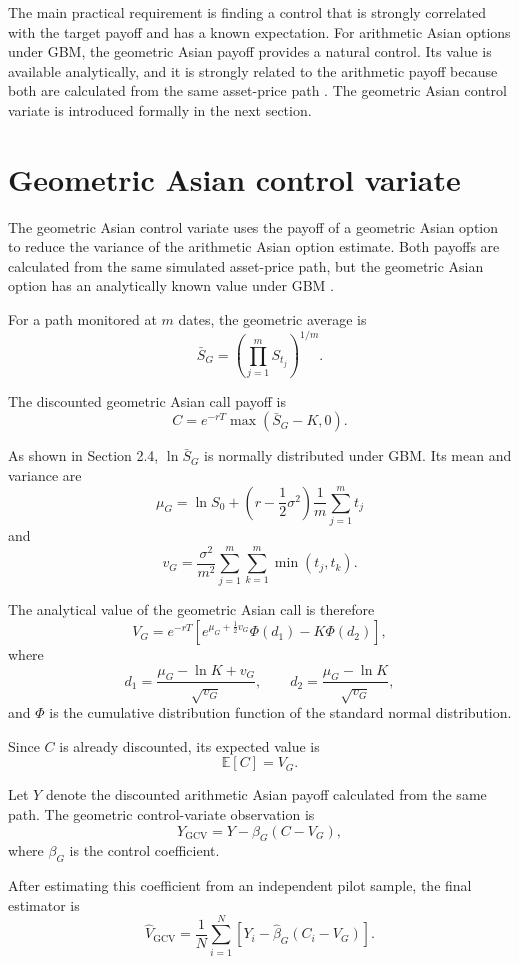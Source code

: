 The main practical requirement is finding a control that is strongly correlated with the target payoff and has a known expectation. For arithmetic Asian options under GBM, the geometric Asian payoff provides a natural control. Its value is available analytically, and it is strongly related to the arithmetic payoff because both are calculated from the same asset-price path \parencite{kemna1990}. The geometric Asian control variate is introduced formally in the next section.

\section{Geometric Asian control variate}

The geometric Asian control variate uses the payoff of a geometric Asian option to reduce the variance of the arithmetic Asian option estimate. Both payoffs are calculated from the same simulated asset-price path, but the geometric Asian option has an analytically known value under GBM \parencite{kemna1990}.

For a path monitored at \(m\) dates, the geometric average is
\[
\bar{S}_G
=
\left(
\prod_{j=1}^{m}S_{t_j}
\right)^{1/m}.
\]

The discounted geometric Asian call payoff is
\[
C
=
e^{-rT}
\max\left(
\bar{S}_G-K,0
\right).
\]

As shown in Section 2.4, \(\ln\bar{S}_G\) is normally distributed under GBM. Its mean and variance are
\[
\mu_G
=
\ln S_0
+
\left(
r-\frac{1}{2}\sigma^2
\right)
\frac{1}{m}
\sum_{j=1}^{m}t_j
\]
and
\[
v_G
=
\frac{\sigma^2}{m^2}
\sum_{j=1}^{m}
\sum_{k=1}^{m}
\min(t_j,t_k).
\]

The analytical value of the geometric Asian call is therefore
\[
V_G
=
e^{-rT}
\left[
e^{\mu_G+\frac{1}{2}v_G}\Phi(d_1)
-
K\Phi(d_2)
\right],
\]
where
\[
d_1
=
\frac{\mu_G-\ln K+v_G}{\sqrt{v_G}},
\qquad
d_2
=
\frac{\mu_G-\ln K}{\sqrt{v_G}},
\]
and \(\Phi\) is the cumulative distribution function of the standard normal distribution.

Since \(C\) is already discounted, its expected value is
\[
\mathbb{E}[C]
=
V_G.
\]

Let \(Y\) denote the discounted arithmetic Asian payoff calculated from the same path. The geometric control-variate observation is
\[
Y_{\mathrm{GCV}}
=
Y-\beta_G(C-V_G),
\]
where \(\beta_G\) is the control coefficient.

After estimating this coefficient from an independent pilot sample, the final estimator is
\[
\widehat{V}_{\mathrm{GCV}}
=
\frac{1}{N}
\sum_{i=1}^{N}
\left[
Y_i
-
\widehat{\beta}_G(C_i-V_G)
\right].
\]

